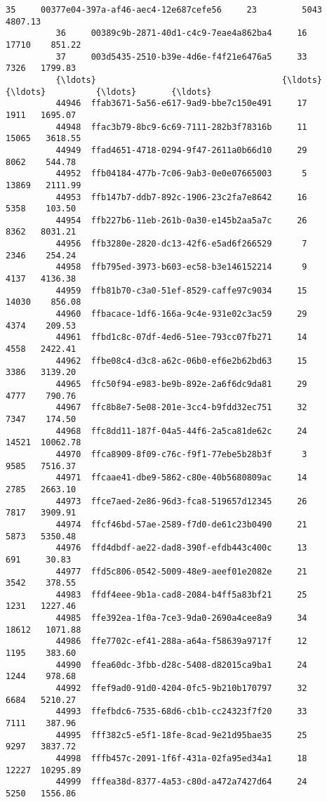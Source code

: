 \documentclass[11pt]{article}
\begin{document}
\begin{Verbatim}[commandchars=\\\{\}]
          35     00377e04-397a-af46-aec4-12e687cefe56     23         5043   4807.13   
          36     00389c9b-2871-40d1-c4c9-7eae4a862ba4     16        17710    851.22   
          37     003d5435-2510-b39e-4d6e-f4f21e6476a5     33         7326   1799.83   
          {\ldots}                                     {\ldots}    {\ldots}          {\ldots}       {\ldots}   
          44946  ffab3671-5a56-e617-9ad9-bbe7c150e491     17         1911   1695.07   
          44948  ffac3b79-8bc9-6c69-7111-282b3f78316b     11        15065   3618.55   
          44949  ffad4651-4718-0294-9f47-2611a0b66d10     29         8062    544.78   
          44952  ffb04184-477b-7c06-9ab3-0e0e07665003      5        13869   2111.99   
          44953  ffb147b7-ddb7-892c-1906-23c2fa7e8642     16         5358    103.50   
          44954  ffb227b6-11eb-261b-0a30-e145b2aa5a7c     26         8362   8031.21   
          44956  ffb3280e-2820-dc13-42f6-e5ad6f266529      7         2346    254.24   
          44958  ffb795ed-3973-b603-ec58-b3e146152214      9         4137   4136.38   
          44959  ffb81b70-c3a0-51ef-8529-caffe97c9034     15        14030    856.08   
          44960  ffbacace-1df6-166a-9c4e-931e02c3ac59     29         4374    209.53   
          44961  ffbd1c8c-07df-4ed6-51ee-793cc07fb271     14         4558   2422.41   
          44962  ffbe08c4-d3c8-a62c-06b0-ef6e2b62bd63     15         3386   3139.20   
          44965  ffc50f94-e983-be9b-892e-2a6f6dc9da81     29         4777    790.76   
          44967  ffc8b8e7-5e08-201e-3cc4-b9fdd32ec751     32         7347    174.50   
          44968  ffc8dd11-187f-04a5-44f6-2a5ca81de62c     24        14521  10062.78   
          44970  ffca8909-8f09-c76c-f9f1-77ebe5b28b3f      3         9585   7516.37   
          44971  ffcaae41-dbe9-5862-c80e-40b5680809ac     14         2785   2663.10   
          44973  ffce7aed-2e86-96d3-fca8-519657d12345     26         7817   3909.91   
          44974  ffcf46bd-57ae-2589-f7d0-de61c23b0490     21         5873   5350.48   
          44976  ffd4dbdf-ae22-dad8-390f-efdb443c400c     13          691     30.83   
          44977  ffd5c806-0542-5009-48e9-aeef01e2082e     21         3542    378.55   
          44983  ffdf4eee-9b1a-cad8-2084-b4ff5a83bf21     25         1231   1227.46   
          44985  ffe392ea-1f0a-7ce3-9da0-2690a4cee8a9     34        18612   1071.88   
          44986  ffe7702c-ef41-288a-a64a-f58639a9717f     12         1195    383.60   
          44990  ffea60dc-3fbb-d28c-5408-d82015ca9ba1     24         1244    978.68   
          44992  ffef9ad0-91d0-4204-0fc5-9b210b170797     32         6684   5210.27   
          44993  ffefbdc6-7535-68d6-cb1b-cc24323f7f20     33         7111    387.96   
          44995  fff382c5-e5f1-18fe-8cad-9e21d95bae35     25         9297   3837.72   
          44998  fffb457c-2091-1f6f-431a-02fa95ed34a1     18        12227  10295.89   
          44999  fffea38d-8377-4a53-c80d-a472a7427d64     24         5250   1556.86   
          

\end{Verbatim}
\end{document}
